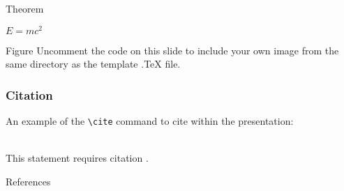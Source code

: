 \documentclass[aspectratio=169,xcolor=dvipsnames]{beamer}
\begin{document}
\begin{frame}{Theorem}
    \begin{theorem}
        $E = mc^2$
    \end{theorem}
\end{frame}


\begin{frame}{Figure}
    Uncomment the code on this slide to include your own image from the same directory as the template .TeX file.
\end{frame}


\begin{frame}[fragile] %
    \frametitle{Citation}
    An example of the \verb|\cite| command to cite within the presentation:\\~

    This statement requires citation \cite{p1}.
\end{frame}


\begin{frame}{References}
    \footnotesize
    
\end{frame}



\fi
\end{document}
